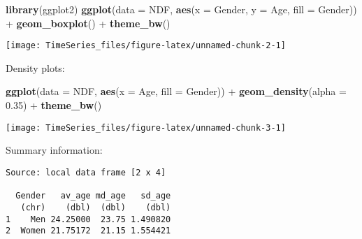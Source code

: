 \documentclass[]{article}
\newenvironment{Shaded}{\begin{snugshade}}{\end{snugshade}}
\newcommand{\KeywordTok}[1]{\textcolor[rgb]{0.13,0.29,0.53}{\textbf{{#1}}}}
\newcommand{\DataTypeTok}[1]{\textcolor[rgb]{0.13,0.29,0.53}{{#1}}}
\newcommand{\FloatTok}[1]{\textcolor[rgb]{0.00,0.00,0.81}{{#1}}}
\newcommand{\StringTok}[1]{\textcolor[rgb]{0.31,0.60,0.02}{{#1}}}
\newcommand{\NormalTok}[1]{{#1}}
\begin{document}
\begin{Shaded}
\begin{Highlighting}[]
\KeywordTok{library}\NormalTok{(ggplot2)}
\KeywordTok{ggplot}\NormalTok{(}\DataTypeTok{data =} \NormalTok{NDF, }\KeywordTok{aes}\NormalTok{(}\DataTypeTok{x =} \NormalTok{Gender, }\DataTypeTok{y =} \NormalTok{Age, }\DataTypeTok{fill =} \NormalTok{Gender)) +}\StringTok{ }\KeywordTok{geom_boxplot}\NormalTok{() +}\StringTok{ }
\StringTok{  }\KeywordTok{theme_bw}\NormalTok{()}
\end{Highlighting}
\end{Shaded}

\begin{center}\texttt{[image: TimeSeries\_files/figure-latex/unnamed-chunk-2-1]} \end{center}

Density plots:

\begin{Shaded}
\begin{Highlighting}[]
\KeywordTok{ggplot}\NormalTok{(}\DataTypeTok{data =} \NormalTok{NDF, }\KeywordTok{aes}\NormalTok{(}\DataTypeTok{x =} \NormalTok{Age, }\DataTypeTok{fill =} \NormalTok{Gender)) +}\StringTok{ }
\StringTok{  }\KeywordTok{geom_density}\NormalTok{(}\DataTypeTok{alpha =} \FloatTok{0.35}\NormalTok{) +}\StringTok{ }
\StringTok{  }\KeywordTok{theme_bw}\NormalTok{()}
\end{Highlighting}
\end{Shaded}

\begin{center}\texttt{[image: TimeSeries\_files/figure-latex/unnamed-chunk-3-1]} \end{center}

Summary information:

\begin{Shaded}
\end{Shaded}

\begin{verbatim}
Source: local data frame [2 x 4]

  Gender   av_age md_age   sd_age
   (chr)    (dbl)  (dbl)    (dbl)
1    Men 24.25000  23.75 1.490820
2  Women 21.75172  21.15 1.554421
\end{verbatim}
\end{document}
